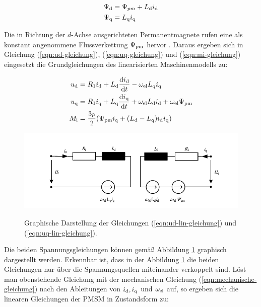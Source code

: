 \begin{align}
	\Psi_{\mathrm{d}} &= \Psi_{pm} + L_{\mathrm{d}}i_{\mathrm{d}} \\
	\Psi_{\mathrm{q}} &= L_{\mathrm{q}}i_{\mathrm{q}}
\end{align}

Die in Richtung der $d$-Achse ausgerichteten Permanentmagnete rufen eine als konstant angenommene Flussverkettung $\Psi_{\mathrm{pm}}$ hervor \autocite{kellner2012}.
Daraus ergeben sich in Gleichung (\ref{eqn:ud-gleichung}), (\ref{eqn:uq-gleichung}) und (\ref{eqn:mi-gleichung}) eingesetzt die Grundgleichungen des linearisierten Maschinenmodells zu:

\begin{align}
		u_{\mathrm{d}} &= R_{\mathrm{1}}i_{\mathrm{d}} + L_{\mathrm{d}}\frac{\mathrm{d}i_{\mathrm{d}}}{\mathrm{d}t}-\omega_{\mathrm{el}}L_{\mathrm{q}}i_{\mathrm{q}} \label{eqn:ud-lin-gleichung} \\
		u_{\mathrm{q}} &= R_{\mathrm{1}}i_{\mathrm{q}} + L_{\mathrm{q}}\frac{\mathrm{d}i_{\mathrm{q}}}{\mathrm{d}t}+\omega_{\mathrm{el}}L_{\mathrm{d}}i_{\mathrm{d}} + \omega_{\mathrm{el}}\Psi_{\mathrm{pm}}  \label{eqn:uq-lin-gleichung} \\
		M_{\mathrm{i}} &= \frac{3p}{2} ( \Psi_{\mathrm{pm}}i_{\mathrm{q}} + (L_{\mathrm{d}}-L_{\mathrm{q}})i_{\mathrm{d}}i_{\mathrm{q}}) \label{eqn:mi-lin-gleichung}
\end{align}

\begin{figure}[h!]
	\centering
	\includegraphics{_Bilder/ESB-synchron-dq.pdf}
	\label{fig:ESB-synchron-dq}
	\caption{Graphische Darstellung der Gleichungen (\ref{eqn:ud-lin-gleichung}) und (\ref{eqn:uq-lin-gleichung}).}
\end{figure}

Die beiden Spannungsgleichungen können gemäß Abbildung \ref{fig:ESB-synchron-dq} graphisch dargestellt werden.
Erkennbar ist, dass in der Abbildung \ref{fig:ESB-synchron-dq} die beiden Gleichungen nur über die Spannungsquellen miteinander verkoppelt sind.
Löst man obenstehende Gleichung mit der mechanischen Gleichung (\ref{eqn:mechanische-gleichung}) nach den Ableitungen von $i_{\mathrm{d}}, i_{\mathrm{q}}$ und $\omega_{\mathrm{el}}$ auf, so ergeben sich die linearen Gleichungen der PMSM in Zustandsform zu:

